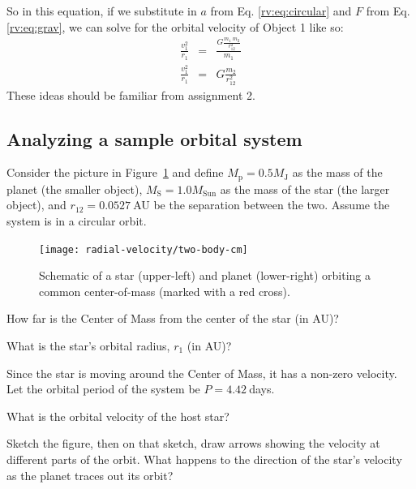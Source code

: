 So in this equation, if we substitute in $a$ from Eq. \ref{rv:eq:circular} and $F$ from Eq. \ref{rv:eq:grav}, we can solve for the orbital velocity of Object 1 like so:
\begin{eqnarray}
 \frac{v_1^2}{r_1} &=& \frac{G \frac{m_1 \: m_2}{r_{12}^2}}{m_1} \\
 \frac{v_1^2}{r_1} &=& G \frac{m_2}{r_{12}^2}
\end{eqnarray}
These ideas should be familiar from assignment 2. 

\subsection{Analyzing a sample orbital system}

Consider the picture in Figure~\ref{rv:fig:two-body-cm} and define $M_\textrm{p} = 0.5 M_\textrm{J}$ as the mass of the planet (the smaller object),  $M_\textrm{S} = 1.0 M_\textrm{Sun}$ as the mass of the star (the larger object), and $r_{12} = 0.0527\:$AU be the separation between the two. Assume the system is in a circular orbit.

\begin{figure}
	\centering
	\texttt{[image: radial-velocity/two-body-cm]}
	\caption{Schematic of a star (upper-left) and planet (lower-right) orbiting a common center-of-mass (marked with a red cross).}\label{rv:fig:two-body-cm}
\end{figure}

\begin{steps}
	\item How far is the Center of Mass from the center of the star (in AU)?
	
	\item What is the star’s orbital radius, $r_1$ (in AU)?
\end{steps}

Since the star is moving around the Center of Mass, it has a non-zero velocity. Let the orbital period of the system be $P = 4.42\:$days.

\begin{steps}
	\item What is the orbital velocity of the host star?
	
	\item Sketch the figure, then on that sketch, draw arrows showing the velocity at different parts of the orbit. What happens to the direction of the star’s velocity as the planet traces out its orbit?
\end{steps}

